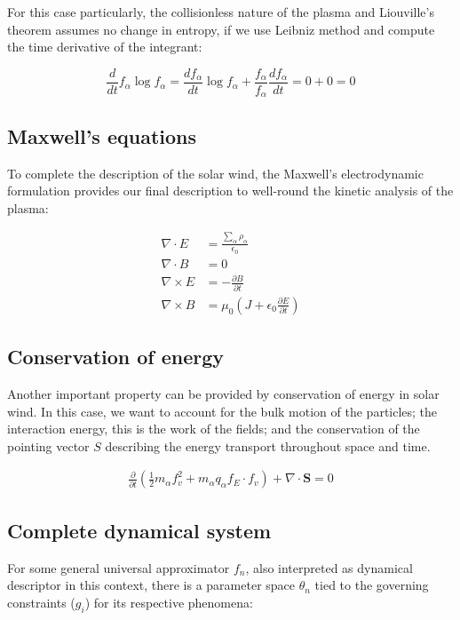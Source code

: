 \documentclass[12pt]{article}
\begin{document}
For this case particularly, the collisionless nature of the plasma and Liouville's theorem assumes no change in entropy, if we use Leibniz method and compute the time derivative of the integrant:

\begin{equation}
    \frac{d}{dt} f_\alpha \log f_\alpha = \frac{df_\alpha}{dt} \log f_\alpha + \frac{f_\alpha}{f_\alpha}\frac{df_\alpha}{dt} = 0 + 0 = 0
\end{equation}

\subsection{Maxwell's equations}

To complete the description of the solar wind, the Maxwell's electrodynamic formulation provides our final description to well-round the kinetic analysis of the plasma:

\begin{align*}
    \nabla \cdot E &= \frac{\sum_{\alpha} \rho_\alpha}{\epsilon_0} \\
    \nabla \cdot B &= 0 \\
    \nabla \times E &= - \frac{\partial B}{\partial t} \\
    \nabla \times B &= \mu_0 \left(J + \epsilon_0 \frac{\partial E}{\partial t}\right)
\end{align*}

\subsection{Conservation of energy}
Another important property can be provided by conservation of energy in solar wind. In this case, we want to account for the bulk motion of the particles; the interaction energy, this is the work of the fields; and the conservation of the pointing vector $S$ describing the energy transport throughout space and time.

\begin{align*}
    \frac{\partial}{\partial t} \left( \frac{1}{2} m_\alpha f_v^2 + m_\alpha q_\alpha f_E \cdot f_v\right) + \nabla \cdot \textbf{S} = 0
\end{align*}

\subsection{Complete dynamical system}
For some general universal approximator $f_n$, also interpreted as dynamical descriptor in this context, there is a parameter space $\theta_n$ tied to the governing constraints ($g_i$) for its respective phenomena:
\end{document}

